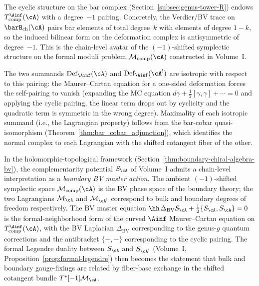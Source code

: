 \begin{remark}
\label{rem:shifted-symplectic-from-cyclic}
The cyclic structure on the bar complex
(Section~\ref{subsec:genus-tower-R}) endows
$T_{\mathrm{comp}}^{\Ainf}(\cA)$ with a degree~$-1$
pairing. Concretely, the Verdier/BV trace on
$\barB_{\mathrm{ch}}(\cA)$ pairs bar elements of total
degree~$k$ with elements of degree $1-k$, so the induced
bilinear form on the deformation complex is antisymmetric
of degree~$-1$. This is the chain-level avatar of the
$(-1)$-shifted symplectic structure on the formal moduli
problem $\mathcal{M}_{\mathrm{comp}}(\cA)$ constructed in
Volume~I.

The two summands $\mathrm{Def}_{\Ainf}(\cA)$ and
$\mathrm{Def}_{\Ainf}(\cA^!)$ are isotropic with respect
to this pairing: the Maurer--Cartan equation for a
one-sided deformation forces the self-pairing to vanish
(expanding the MC equation $d\gamma + \tfrac{1}{2}[\gamma,\gamma]
+ \cdots = 0$ and applying the cyclic pairing, the linear
term drops out by cyclicity and the quadratic term is
symmetric in the wrong degree). Maximality of each
isotropic summand (i.e., the Lagrangian property) follows
from the bar-cobar quasi-isomorphism
(Theorem~\ref{thm:bar_cobar_adjunction}), which
identifies the normal complex to each Lagrangian with the
shifted cotangent fiber of the other.
\end{remark}

\begin{remark}
\label{rem:bv-complementarity-potential}
In the holomorphic-topological framework
(Section~\ref{thm:boundary-chiral-algebra-bv}), the
complementarity potential $S_\cA$ of Volume~I admits a
chain-level interpretation as a \emph{boundary BV master
action}. The ambient $(-1)$-shifted symplectic space
$\mathcal{M}_{\mathrm{comp}}(\cA)$ is the BV phase space
of the boundary theory; the two Lagrangians
$\mathcal{M}_\cA$ and $\mathcal{M}_{\cA^!}$ correspond to
bulk and boundary degrees of freedom respectively. The
BV master equation
$\hh\,\Delta_{\mathrm{BV}} S_\cA
+ \tfrac{1}{2}\{S_\cA, S_\cA\} = 0$
is the formal-neighborhood form of the curved $\Ainf$
Maurer--Cartan equation on
$T_{\mathrm{comp}}^{\Ainf}(\cA)$, with the BV Laplacian
$\Delta_{\mathrm{BV}}$ corresponding to the genus-$g$
quantum corrections and the antibracket $\{-,-\}$
corresponding to the cyclic pairing. The formal Legendre
duality between $S_\cA$ and $S_{\cA^!}$ (Volume~I,
Proposition~\ref*{prop:formal-legendre}) then becomes the
statement that bulk and boundary gauge-fixings are related
by fiber-base exchange in the shifted cotangent bundle
$T^*[-1]\mathcal{M}_\cA$.
\end{remark}

